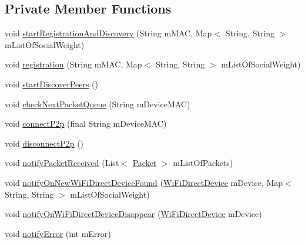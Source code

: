 \subsection*{Private Member Functions}
\begin{DoxyCompactItemize}
\item 
void \hyperlink{classcom_1_1copelabs_1_1oiframework_1_1wifi_1_1_wi_fi_direct_utils_a233c704fa5bea700f65f5ca2f0117806}{start\+Registration\+And\+Discovery} (String m\+M\+A\+C, Map$<$ String, String $>$ m\+List\+Of\+Social\+Weight)
\item 
void \hyperlink{classcom_1_1copelabs_1_1oiframework_1_1wifi_1_1_wi_fi_direct_utils_a8dd527bd4cd0f3c7f044b84fb366e806}{registration} (String m\+M\+A\+C, Map$<$ String, String $>$ m\+List\+Of\+Social\+Weight)
\item 
void \hyperlink{classcom_1_1copelabs_1_1oiframework_1_1wifi_1_1_wi_fi_direct_utils_a599a162bf2cef15bcba9b295f0869f72}{start\+Discover\+Peers} ()
\item 
void \hyperlink{classcom_1_1copelabs_1_1oiframework_1_1wifi_1_1_wi_fi_direct_utils_adcd0c859c8940e7f938bfd4535a3c9ef}{check\+Next\+Packet\+Queue} (String m\+Device\+M\+A\+C)
\item 
void \hyperlink{classcom_1_1copelabs_1_1oiframework_1_1wifi_1_1_wi_fi_direct_utils_a9a2f5d3375e763f8d1210efe750bb06e}{connect\+P2p} (final String m\+Device\+M\+A\+C)
\item 
void \hyperlink{classcom_1_1copelabs_1_1oiframework_1_1wifi_1_1_wi_fi_direct_utils_adf5c4576f75a1a9d8b151b421d645219}{disconnect\+P2p} ()
\item 
void \hyperlink{classcom_1_1copelabs_1_1oiframework_1_1wifi_1_1_wi_fi_direct_utils_acfca57808d1beb5e453cfd9600436f4a}{notify\+Packet\+Received} (List$<$ \hyperlink{classcom_1_1copelabs_1_1oiframework_1_1contentmanager_1_1_packet}{Packet} $>$ m\+List\+Of\+Packets)
\item 
void \hyperlink{classcom_1_1copelabs_1_1oiframework_1_1wifi_1_1_wi_fi_direct_utils_a65c0e50bd52822e5022c2e20a646daa0}{notify\+On\+New\+Wi\+Fi\+Direct\+Device\+Found} (\hyperlink{classcom_1_1copelabs_1_1oiframework_1_1wifi_1_1_wi_fi_direct_device}{Wi\+Fi\+Direct\+Device} m\+Device, Map$<$ String, String $>$ m\+List\+Of\+Social\+Weight)
\item 
void \hyperlink{classcom_1_1copelabs_1_1oiframework_1_1wifi_1_1_wi_fi_direct_utils_a2a8dcaa1bfb908583e7a5ee6f9f212b3}{notify\+On\+Wi\+Fi\+Direct\+Device\+Disappear} (\hyperlink{classcom_1_1copelabs_1_1oiframework_1_1wifi_1_1_wi_fi_direct_device}{Wi\+Fi\+Direct\+Device} m\+Device)
\item 
void \hyperlink{classcom_1_1copelabs_1_1oiframework_1_1wifi_1_1_wi_fi_direct_utils_a3bba8b0da6ce3671e5869c281bb0359f}{notify\+Error} (int m\+Error)
\end{DoxyCompactItemize}
